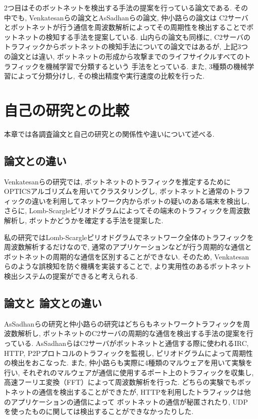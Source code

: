 \documentclass[twocolumn,9]{ltjsarticle}
\begin{document}
2つ目はそのボットネットを検出する手法の提案を行っている論文である. 
その中でも, Venkatesanらの論文\cite{venkatesan2018debot}とAsSadhanらの論文\cite{assadhan2018analysis}, 
仲小路らの論文\cite{仲小路博史2005周波数分析に基づくインシデント傾向検知手法に関する検討}は
C2サーバとボットネットが行う通信を周波数解析によってその周期性を検出することでボットネットの検知する手法を提案している. 
山内らの論文\cite{山内一将2015c}も同様に, C2サーバのトラフィックからボットネットの検知手法についての論文ではあるが, 
上記3つの論文とは違い, ボットネットの形成から攻撃までのライフサイクルすべてのトラフィックを機械学習で分類するという
手法をとっている. また, 3種類の機械学習によって分類分けし, その検出精度や実行速度の比較を行った. 

\section{自己の研究との比較}
本章では各調査論文と自己の研究との関係性や違いについて述べる. 

\subsection{論文\cite{venkatesan2018debot}との違い}
Venkatesanらの研究では, ボットネットのトラフィックを推定するためにOPTICSアルゴリズムを用いてクラスタリングし, 
ボットネットと通常のトラフィックの違いを利用してネットワーク内からボットの疑いのある端末を検出し, さらに, 
Lomb-Scargleピリオドグラムによってその端末のトラフィックを周波数解析し, ボットかどうかを確定する手法を提案した. 

私の研究ではLomb-Scargleピリオドグラムでネットワーク全体のトラフィックを周波数解析するだけなので, 
通常のアプリケーションなどが行う周期的な通信とボットネットの周期的な通信を区別することができない. 
そのため, Venkatesanらのような誤検知を防ぐ機構を実装することで, 
より実用性のあるボットネット検出システムの提案ができると考えられる. 

\subsection{論文\cite{assadhan2018analysis}と
論文\cite{仲小路博史2005周波数分析に基づくインシデント傾向検知手法に関する検討}との違い}
AsSadhanらの研究と仲小路らの研究はどちらもネットワークトラフィックを周波数解析し, 
ボットネットのC2サーバの周期的な通信を検出する手法の提案を行っている. 
AsSadhanらはC2サーバがボットネットと通信する際に使われるIRC, HTTP, P2Pプロトコルのトラフィックを監視し, 
ピリオドグラムによって周期性の検出をおこなった. また, 仲小路らも実際に4種類のマルウェアを用いて実験を行い, 
それぞれのマルウェアが通信に使用するポート上のトラフィックを収集し, 高速フーリエ変換（FFT）によって周波数解析を行った. 
どちらの実験でもボットネットの通信を検出することができたが, HTTPを利用したトラフィックは他のアプリケーションの通信によって
ボットネットの通信が秘匿されたり, UDPを使ったものに関しては検出することができなかったりした. 
\end{document}
